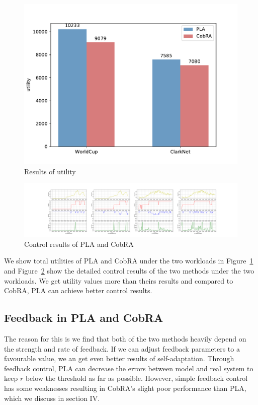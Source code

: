 \documentclass[sigconf]{acmart}
\begin{document}
\begin{figure}[h]
	\centering
	\includegraphics[width=\linewidth]{utility-simi}
	\caption{Results of utility}
	\label{utility-simi}
\end{figure}
\begin{figure}[h]
	\centering
	\includegraphics[width=\linewidth]{similarity}
	\caption{Control results of PLA and CobRA}
	\label{similarity}
\end{figure}

We show total utilities of PLA and CobRA under the two workloads in Figure~\ref{utility-simi} and Figure~\ref{similarity} show the detailed control results of the two methods under the two workloads. We get utility values more than theirs results and compared to CobRA, PLA can achieve better control results. 


\subsection{Feedback in PLA and CobRA}

The reason for this is we find that both of the two methods heavily depend on the strength and rate of feedback. If we can adjust feedback parameters to a favourable value, we an get even better results of self-adaptation.  Through feedback control, PLA can decrease the errors between model and real system to keep $r$  below the threshold as far as possible. However, simple feedback control has some weaknesses resulting in CobRA's slight poor performance than PLA, which we discuss in section IV.
\end{document}
